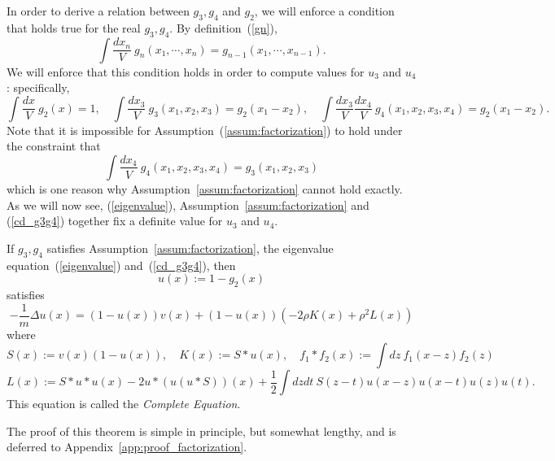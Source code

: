 \documentclass{ian}
\begin{document}
\indent
In order to derive a relation between $g_3,g_4$ and $g_2$, we will enforce a condition that holds true for the real $g_3,g_4$.
By definition\-~(\ref{gn}),
\begin{equation}
  \int\frac{dx_n}V\ g_n(x_1,\cdots,x_n)
  =g_{n-1}(x_1,\cdots,x_{n-1})
  .
\end{equation}
We will enforce that this condition holds in order to compute values for $u_3$ and $u_4$: specifically,
\begin{equation}
  \int\frac{dx}V\ g_2(x)=1
  ,\quad
  \int\frac{dx_3}V\ g_3(x_1,x_2,x_3)
  =g_{2}(x_1-x_2)
  ,\quad
  \int\frac{dx_3}V\frac{dx_4}V\ g_4(x_1,x_2,x_3,x_4)
  =g_{2}(x_1-x_2)
  .
  \label{cd_g3g4}
\end{equation}
Note that it is impossible for Assumption\-~(\ref{assum:factorization}) to hold under the constraint that
\begin{equation}
  \int\frac{dx_4}V\ g_4(x_1,x_2,x_3,x_4)
  =g_{3}(x_1,x_2,x_3)
\end{equation}
which is one reason why Assumption\-~\ref{assum:factorization} cannot hold exactly.
As we will now see, (\ref{eigenvalue}), Assumption\-~\ref{assum:factorization} and (\ref{cd_g3g4}) together fix a definite value for $u_3$ and $u_4$.
\bigskip

\label{theo:compleq}
  If $g_3,g_4$ satisfies Assumption\-~\ref{assum:factorization}, the eigenvalue equation\-~(\ref{eigenvalue}) and\-~(\ref{cd_g3g4}), then
  \begin{equation}
    u(x):=1-g_2(x)
  \end{equation}
  satisfies
  \begin{equation}
    -\frac1m\Delta u(x)
    =
    (1-u(x))v(x)
    +
    (1-u(x))(-2\rho K(x)+\rho^2L(x))
    \label{compleq}
  \end{equation}
  where
  \begin{equation}
    S(x):=v(x)(1-u(x))
    ,\quad
    K(x)
    :=
    S\ast u(x)
    ,\quad
    f_1\ast f_2(x):=\int dz\ f_1(x-z)f_2(z)
  \end{equation}
  \begin{equation}
    L(x)
    :=
    S\ast u\ast u(x)
    -2u\ast(u(u\ast S))(x)
    +\frac12\int dzdt\ S(z-t) u(x-z)u(x-t)u(z)u(t)
    .
    \label{compleqL}
  \end{equation}
  This equation is called the {\it Complete Equation}.
\endtheo
\bigskip

The proof of this theorem is simple in principle, but somewhat lengthy, and is deferred to Appendix\-~\ref{app:proof_factorization}.
\end{document}
